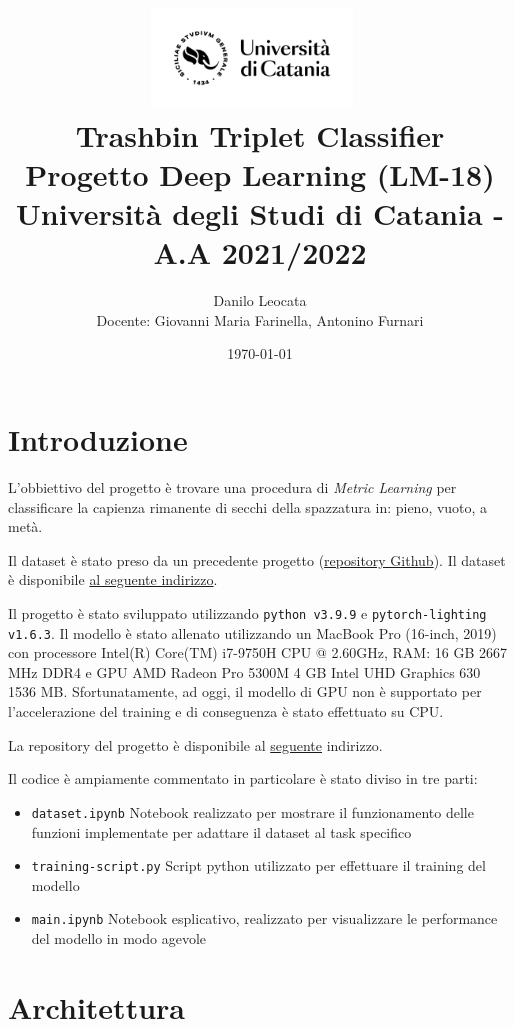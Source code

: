 \documentclass[11pt]{article}
\title{ %
\includegraphics[width=0.4\textwidth]{UniCT-Logo-Nero}~\\
Trashbin Triplet Classifier \\ 
\large Progetto Deep Learning (LM-18) \\ Università degli Studi di Catania - A.A 2021/2022 \\
}
\author{ Danilo Leocata \\ Docente: Giovanni Maria Farinella, Antonino Furnari}
\date{\today}
\begin{document}
\maketitle	
\pagebreak


\section{Introduzione}

L'obbiettivo del progetto è trovare una procedura di \textit{Metric Learning} per classificare la 
capienza rimanente di secchi della spazzatura in: pieno, vuoto, a metà.

Il dataset è stato preso da un precedente progetto (\href{https://github.com/khalld/trashbin-classifier}{repository Github}). Il dataset è disponibile \href{https://drive.google.com/drive/folders/11SGtZrM8BWJDPOcnKR7RjLJs0dJOfSCA?usp=sharing}{al seguente indirizzo}.

Il progetto è stato sviluppato utilizzando \texttt{python v3.9.9} e \texttt{pytorch-lighting v1.6.3}. Il modello è stato allenato utilizzando un MacBook Pro (16-inch, 2019) con processore Intel(R) Core(TM) i7-9750H CPU @ 2.60GHz, RAM: 16 GB 2667 MHz DDR4 e GPU AMD Radeon Pro 5300M 4 GB
Intel UHD Graphics 630 1536 MB. Sfortunatamente, ad oggi, il modello di GPU non è supportato per l'accelerazione del training e di conseguenza è stato effettuato su CPU.

La repository del progetto è disponibile al \href{https://github.com/khalld/triplet-trashbin-classifier}{seguente} indirizzo.

Il codice è ampiamente commentato in particolare è stato diviso in tre parti:

\begin{itemize}
    \item \texttt{dataset.ipynb} Notebook realizzato per mostrare il funzionamento delle funzioni implementate per adattare il dataset al task specifico
    \item \texttt{training-script.py} Script python utilizzato per effettuare il training del modello
    \item \texttt{main.ipynb} Notebook esplicativo, realizzato per visualizzare le performance del modello in modo agevole
\end{itemize}

\section{Architettura}
\end{document}
